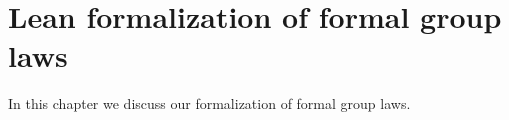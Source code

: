 \chapter{Lean formalization of formal group laws}

In this chapter we discuss our formalization of formal group laws.









% 

% 

